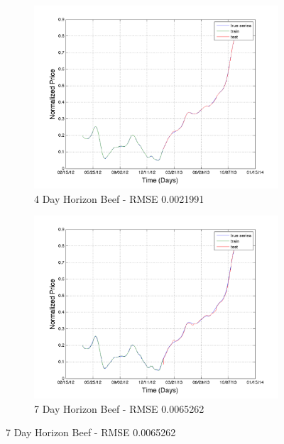 \begin{figure}
        \centering
        \begin{subfigure}[b]{0.5\textwidth}
                \includegraphics[width=\textwidth]{img/model/beef/model3_3/pred_4}
                \caption{4 Day Horizon Beef - RMSE 0.0021991}
                \label{fig:gull}
        \end{subfigure}%
           \begin{subfigure}[b]{0.5\textwidth}
                \includegraphics[width=\textwidth]{img/model/beef/model3_3/pred_7}
                \caption{7 Day Horizon Beef - RMSE 0.0065262}
                \label{fig:gull}
        \end{subfigure}%
              \hfill    

\end{figure}
